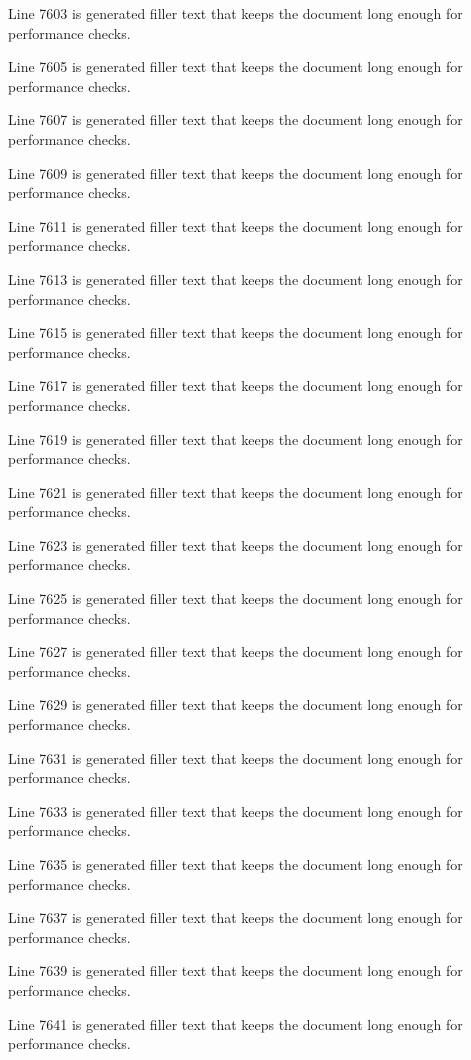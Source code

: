 Line 7603 is generated filler text that keeps the document long enough for performance checks.

Line 7605 is generated filler text that keeps the document long enough for performance checks.

Line 7607 is generated filler text that keeps the document long enough for performance checks.

Line 7609 is generated filler text that keeps the document long enough for performance checks.

Line 7611 is generated filler text that keeps the document long enough for performance checks.

Line 7613 is generated filler text that keeps the document long enough for performance checks.

Line 7615 is generated filler text that keeps the document long enough for performance checks.

Line 7617 is generated filler text that keeps the document long enough for performance checks.

Line 7619 is generated filler text that keeps the document long enough for performance checks.

Line 7621 is generated filler text that keeps the document long enough for performance checks.

Line 7623 is generated filler text that keeps the document long enough for performance checks.

Line 7625 is generated filler text that keeps the document long enough for performance checks.

Line 7627 is generated filler text that keeps the document long enough for performance checks.

Line 7629 is generated filler text that keeps the document long enough for performance checks.

Line 7631 is generated filler text that keeps the document long enough for performance checks.

Line 7633 is generated filler text that keeps the document long enough for performance checks.

Line 7635 is generated filler text that keeps the document long enough for performance checks.

Line 7637 is generated filler text that keeps the document long enough for performance checks.

Line 7639 is generated filler text that keeps the document long enough for performance checks.

Line 7641 is generated filler text that keeps the document long enough for performance checks.


